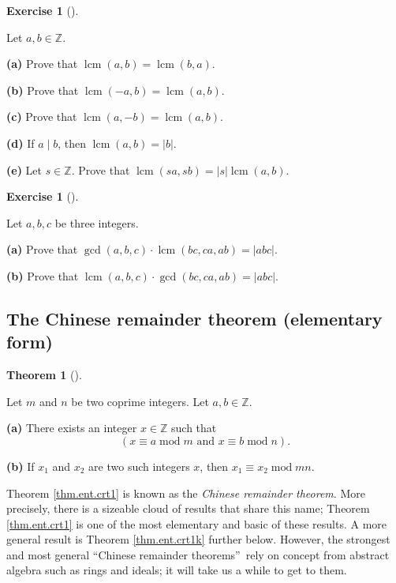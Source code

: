 \documentclass[numbers=enddot,12pt,final,onecolumn,notitlepage]{scrartcl}%
\newcounter{exer}
\numberwithin{exer}{subsection}
\theoremstyle{definition}
\newtheorem{theo}{Theorem}[subsection]
\newenvironment{theorem}[1][]
{\begin{theo}[#1]\begin{leftbar}}
{\end{leftbar}\end{theo}}
\newtheorem{exmp}[exer]{Exercise}
\newenvironment{exercise}[1][]
{\begin{exmp}[#1]\begin{leftbar}}
{\end{leftbar}\end{exmp}}
\begin{document}
\begin{exercise}
\label{exe.ent.lcm.props1}Let $a,b\in\mathbb{Z}$.

\textbf{(a)} Prove that $\operatorname{lcm}\left(  a,b\right)
=\operatorname{lcm}\left(  b,a\right)  $.

\textbf{(b)} Prove that $\operatorname{lcm}\left(  -a,b\right)
=\operatorname{lcm}\left(  a,b\right)  $.

\textbf{(c)} Prove that $\operatorname{lcm}\left(  a,-b\right)
=\operatorname{lcm}\left(  a,b\right)  $.

\textbf{(d)} If $a\mid b$, then $\operatorname{lcm}\left(  a,b\right)
=\left\vert b\right\vert $.

\textbf{(e)} Let $s\in\mathbb{Z}$. Prove that $\operatorname{lcm}\left(
sa,sb\right)  =\left\vert s\right\vert \operatorname{lcm}\left(  a,b\right)  $.
\end{exercise}

\begin{exercise}
\label{exe.ent.lcm.lcmabc}Let $a,b,c$ be three integers.

\textbf{(a)} Prove that $\gcd\left(  a,b,c\right)  \cdot\operatorname{lcm}%
\left(  bc,ca,ab\right)  =\left\vert abc\right\vert $.

\textbf{(b)} Prove that $\operatorname{lcm}\left(  a,b,c\right)  \cdot
\gcd\left(  bc,ca,ab\right)  =\left\vert abc\right\vert $.
\end{exercise}

\subsection{The Chinese remainder theorem (elementary form)}

\begin{theorem}
\label{thm.ent.crt1}Let $m$ and $n$ be two coprime integers. Let
$a,b\in\mathbb{Z}$.

\textbf{(a)} There exists an integer $x\in\mathbb{Z}$ such that%
\[
\left(  x\equiv a\operatorname{mod}m\text{ and }x\equiv b\operatorname{mod}%
n\right)  .
\]


\textbf{(b)} If $x_{1}$ and $x_{2}$ are two such integers $x$, then
$x_{1}\equiv x_{2}\operatorname{mod}mn$.
\end{theorem}

Theorem \ref{thm.ent.crt1} is known as the \textit{Chinese remainder theorem}.
More precisely, there is a sizeable cloud of results that share this name;
Theorem \ref{thm.ent.crt1} is one of the most elementary and basic of these
results. A more general result is Theorem \ref{thm.ent.crt1k} further below.
However, the strongest and most general \textquotedblleft Chinese remainder
theorems\textquotedblright\ rely on concept from abstract algebra such as
rings and ideals; it will take us a while to get to them.
\end{document}
